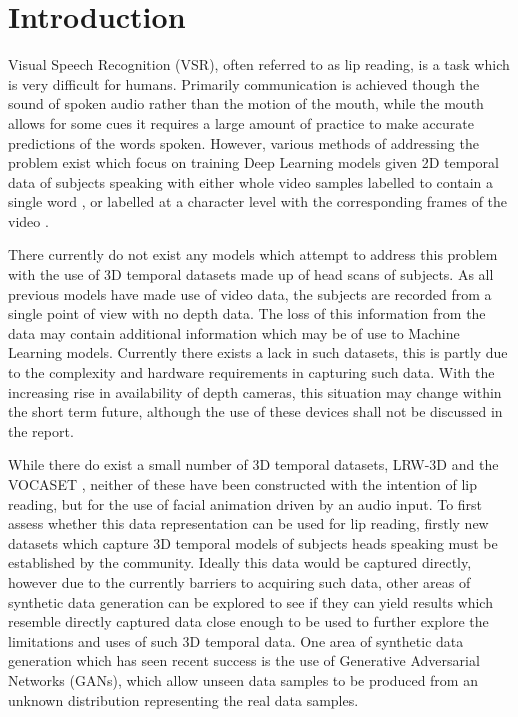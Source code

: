 \chapter{Introduction}

Visual Speech Recognition (VSR), often referred to as lip reading, is a task which is very difficult for humans.
Primarily communication is achieved though the sound of spoken audio rather than the motion of the mouth, while the mouth allows for some cues it requires a large amount of practice to make accurate predictions of the words spoken.
However, various methods of addressing the problem exist which focus on training Deep Learning models given 2D temporal data of subjects speaking with either whole video samples labelled to contain a single word \cite{Chung2016}, or labelled at a character level with the corresponding frames of the video \cite{Assael2016, Chung2017, Shillingford2018}.

There currently do not exist any models which attempt to address this problem with the use of 3D temporal datasets made up of head scans of subjects.
As all previous models have made use of video data, the subjects are recorded from a single point of view with no depth data.
The loss of this information from the data may contain additional information which may be of use to Machine Learning models.
Currently there exists a lack in such datasets, this is partly due to the complexity and hardware requirements in capturing such data. 
With the increasing rise in availability of depth cameras, this situation may change within the short term future, although the use of these devices shall not be discussed in the report.

While there do exist a small number of 3D temporal datasets, LRW-3D \cite{Tzirakis2019} and the VOCASET \cite{Cudeiro2019}, neither of these have been constructed with the intention of lip reading, but for the use of facial animation driven by an audio input.
To first assess whether this data representation can be used for lip reading, firstly new datasets which capture 3D temporal models of subjects heads speaking must be established by the community.
Ideally this data would be captured directly, however due to the currently barriers to acquiring such data, other areas of synthetic data generation can be explored to see if they can yield results which resemble directly captured data close enough to be used to further explore the limitations and uses of such 3D temporal data.
One area of synthetic data generation which has seen recent success is the use of Generative Adversarial Networks (GANs), which allow unseen data samples to be produced from an unknown distribution representing the real data samples.

